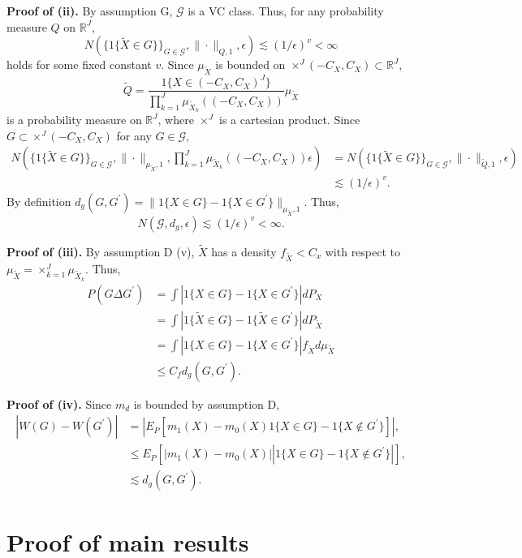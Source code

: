 \documentclass[12pt,oneside,reqno,english]{amsart}
\theoremstyle{definition}
\begin{document}
\textbf{Proof of (ii).}
By assumption G, $\mathcal{G}$ is a VC class. Thus, for any probability measure $Q$ on $\mathbb{R}^{J}$, 
\[N(\{1\{\tilde{X}\in G\}\}_{G\in \mathcal{G}},\|\cdot\|_{Q,1},\epsilon)\lesssim (1/\epsilon)^{v}<\infty\]
holds for some fixed constant $v$. 
Since $\mu_{\tilde{X}}$ is bounded on $\times^{J}(-C_{X},C_{X})\subset \mathbb{R}^{J}$,  
\[\tilde{Q}=\frac{1\{X\in (-C_{X},C_{X})^{J}\}}{\prod_{k=1}^{J}\mu_{\tilde{X}_{k}}((-C_{X},C_{X}))}\mu_{\tilde{X}}\]
is a probability measure on $\mathbb{R}^{J}$, where $\times^{J}$ is a cartesian product. 
Since $G\subset \times^{J}(-C_{X},C_{X})$ for any $G\in \mathcal{G}$, 
\begin{align*}
N\left(\{1\{\tilde{X}\in G\}\}_{G\in \mathcal{G}},\|\cdot\|_{\mu_{\tilde{X}},1},\prod_{k=1}^{J}\mu_{\tilde{X}_{k}}((-C_{X},C_{X}))\epsilon\right)
&=N(\{1\{\tilde{X}\in G\}\}_{G\in \mathcal{G}},\|\cdot\|_{\tilde{Q},1},\epsilon)\\
&\lesssim (1/\epsilon)^{v}.
\end{align*}
By definition $d_{g}(G,G^{\prime})=\|1\{X\in G\}-1\{X\in G^{\prime}\} \|_{\mu_{\tilde{X}},1}$. 
Thus, 
\[N(\mathcal{G},d_{g},\epsilon)\lesssim (1/\epsilon)^{v}<\infty.\]

\textbf{Proof of (iii).} By assumption D (v), $\tilde{X}$ has a density $f_{\tilde{X}}<C_{x}$ with respect to $\mu_{\tilde{X}}=\times_{k=1}^{J}\mu_{\tilde{X}_{k}}$. 
Thus, 
\begin{align*}
P(G\Delta G^{\prime})&=\int |1\{X\in G\}-1\{X\in G^{\prime}\}|dP_{X}\\
&=\int |1\{\tilde{X}\in G\}-1\{\tilde{X}\in G^{\prime}\}|dP_{\tilde{X}}\\
&= \int |1\{X\in G\}-1\{X\in G^{\prime}\}|f_{\tilde{X}} d\mu_{\tilde{X}}\\
&\leq C_{f}d_{g}(G,G^{\prime}).
\end{align*}

\textbf{Proof of (iv).} Since $m_{d}$ is bounded by assumption D, 
\begin{align*}
|W(G)-W(G^{\prime})|&=\left|E_{P}[ m_{1}(X)-m_{0}(X)1\{X\in G\}-1\{X\not\in G^{\prime}\}]\right|,\\
&\leq E_{P}[\left| m_{1}(X)-m_{0}(X)\right|\left|1\{X\in G\}-1\{X\not\in G^{\prime}\}\right|],\\
&\lesssim d_{g}(G,G^{\prime}).
\end{align*}


\section{Proof of main results}
\end{document}

